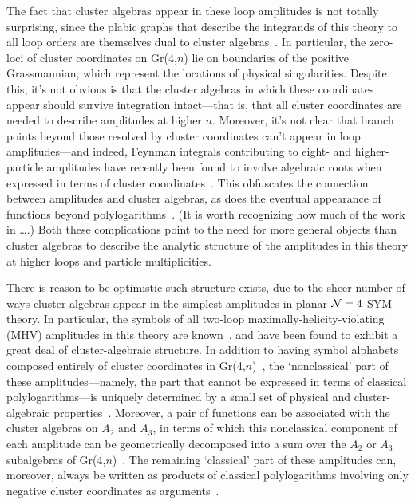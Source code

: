 \documentclass[11pt]{article}
\begin{document}
The fact that cluster algebras appear in these loop amplitudes is not totally surprising, since the plabic graphs that describe the integrands of this theory to all loop orders are themselves dual to cluster algebras~\cite{ArkaniHamed:2012nw}. In particular, the zero-loci of cluster coordinates on Gr(4,$n$) lie on boundaries of the positive Grassmannian, which represent the locations of physical singularities. Despite this, it's not obvious is that the cluster algebras in which these coordinates appear should survive integration intact---that is, that all cluster coordinates are needed to describe amplitudes at higher $n$. Moreover, it's not clear that branch points beyond those resolved by cluster coordinates can't appear in loop amplitudes---and indeed, Feynman integrals contributing to eight- and higher-particle amplitudes have recently been found to involve algebraic roots when expressed in terms of cluster coordinates~\cite{Prlina:2017azl,Bourjaily:2018aeq,Henn:2018cdp}. This obfuscates the connection between amplitudes and cluster algebras, as does the eventual appearance of functions beyond polylogarithms~\cite{}. (It is worth recognizing how much of the work in \dots.) Both these complications point to the need for more general objects than cluster algebras to describe the analytic structure of the amplitudes in this theory at higher loops and particle multiplicities.

There is reason to be optimistic such structure exists, due to the sheer number of ways cluster algebras appear in the simplest amplitudes in planar ${\cal N}=4$ SYM theory. In particular, the symbols of all two-loop maximally-helicity-violating (MHV) amplitudes in this theory are known~\cite{CaronHuot:2011ky}, and have been found to exhibit a great deal of cluster-algebraic structure. In addition to having symbol alphabets composed entirely of cluster coordinates in Gr(4,$n$)~\cite{Golden:2013xva,Golden:2013lha,Golden:2014xqa,Golden:2014pua}, the `nonclassical' part of these amplitudes---namely, the part that cannot be expressed in terms of classical polylogarithms---is uniquely determined by a small set of physical and cluster-algebraic properties~\cite{Golden:2014pua}.  Moreover, a pair of functions can be associated with the cluster algebras on $A_2$ and $A_3$, in terms of which this nonclassical component of each amplitude can be geometrically decomposed into a sum over the $A_2$ or $A_3$ subalgebras of Gr(4,$n$)~\cite{Golden:2014xqa}. The remaining `classical' part of these amplitudes can, moreover, always be written as products of classical polylogarithms involving only negative cluster coordinates as arguments~\cite{Golden:2014xqf}.
\end{document}
